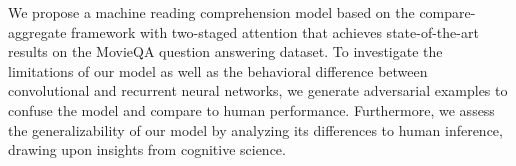 We propose a machine reading comprehension model based on the compare-aggregate framework with two-staged attention that achieves state-of-the-art results on the MovieQA question answering dataset. To investigate the limitations of our model as well as the behavioral difference between convolutional and recurrent neural networks, we generate adversarial examples to confuse the model and compare to human performance. Furthermore, we assess the generalizability of our model by analyzing its differences to human inference, drawing upon insights from cognitive science.
